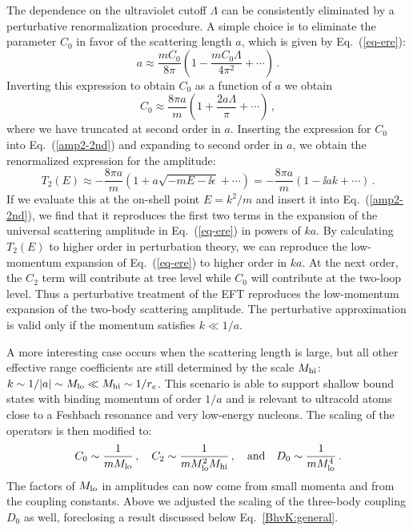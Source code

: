The dependence on the ultraviolet cutoff $\Lambda$ can be consistently
eliminated by a perturbative renormalization procedure. A simple choice
is to eliminate the parameter $C_0$ in favor of the scattering length
$a$, which is given by Eq.~(\ref{eq-ere}):
\begin{equation}
 a \approx \frac{mC_0}{8 \pi} \left( 1- \frac{m C_0 \Lambda}{4\pi^2}
 + \cdots\right) \,.
\end{equation}
Inverting this expression to obtain $C_0$ as a function of $a$ we obtain
\begin{equation}
 C_0  \approx \frac{8 \pi a}{m} \left( 1+ \frac{2 a \Lambda}{\pi}
 +  \cdots \right) \,,
\end{equation}
where we have truncated at second order in $a$. Inserting the expression
for $C_0$ into Eq.~(\ref{amp2-2nd}) and expanding to second order in $a$,
we obtain the renormalized expression for the amplitude:
\begin{equation}
 T_2 (E) \approx {-}\frac{8 \pi a}{m} \left( 1 + a \sqrt{-mE - \ii 
 \epsilon} + \cdots \right) = {-}\frac{8 \pi a}{m} \left( 1 - \ii ak +
 \cdots \right) \,.
\label{A2pert}
\end{equation}
If we evaluate this at the on-shell point $E=k^2/m$ and insert it into
Eq.~(\ref{amp2-2nd}), we find that it reproduces the first two terms in the
expansion of the universal scattering amplitude in Eq.~(\ref{eq-ere}) 
in powers of $ka$. By calculating $T_2 (E)$ to higher order 
in perturbation theory, we can reproduce the low-momentum 
expansion of Eq.~(\ref{eq-ere}) to higher order in $ka$. At the next order,
the $C_2$ term will contribute at tree level while $C_0$ will contribute
at the two-loop level. Thus a perturbative
treatment of the EFT reproduces the low-momentum
expansion of the two-body scattering amplitude.
The perturbative approximation is valid only if the momentum satisfies
$k \ll 1/a$.

A more interesting case occurs when the scattering length
is large, but all other effective range coefficients are still
determined by the scale $M_{\rm hi}$: $k\sim 1/|a|\sim M_{\rm lo} \ll M_{\rm hi} \sim 1/r_e$.
This scenario
is able to support shallow bound states with binding momentum of order $1/a$
and is relevant to ultracold atoms close to a
Feshbach resonance and very low-energy nucleons.
The scaling of the operators is then modified to:
\begin{equation}
 C_0 \sim \frac{1}{m\Mlo}\,,\quad C_2 \sim \frac{1}{m\Mlo^2\Mhi} \,,
 \quad\text{and}\quad
 D_0 \sim \frac{1}{m\Mlo^4}\,.
\label{eq:scalingMlo}
\end{equation}
The factors of $M_{\rm lo}$ in amplitudes can now come from small momenta and from the
coupling constants.  Above we adjusted the scaling of the three-body coupling 
$D_0$ as well, foreclosing a result discussed below Eq.~\eqref{BhvK:general}.

